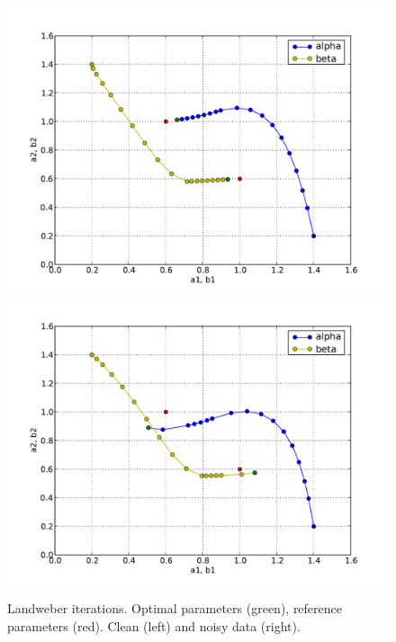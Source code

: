 \begin{figure}
  \begin{center}
    \includegraphics[width=\smallfig]{chapters/schroll/pdf/4Dscan3b.pdf}
    \includegraphics[width=\smallfig]{chapters/schroll/pdf/4Dscan3b-5.pdf}
    \vspace{-0.7cm}
    \label{fig4}
    \caption{Landweber iterations. Optimal parameters (green), reference
    parameters (red). Clean (left) and noisy data (right).}
  \end{center}
\end{figure}

